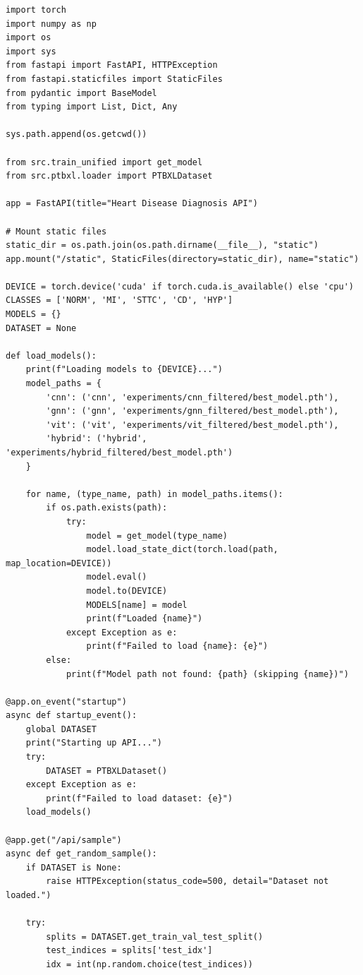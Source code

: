 \documentclass[12pt,a4paper]{report}
\begin{document}
\begin{lstlisting}[caption={Asynchronous FastAPI web service endpoint implementations (src/webapp/main.py)}]
import torch
import numpy as np
import os
import sys
from fastapi import FastAPI, HTTPException
from fastapi.staticfiles import StaticFiles
from pydantic import BaseModel
from typing import List, Dict, Any

sys.path.append(os.getcwd())

from src.train_unified import get_model
from src.ptbxl.loader import PTBXLDataset

app = FastAPI(title="Heart Disease Diagnosis API")

# Mount static files
static_dir = os.path.join(os.path.dirname(__file__), "static")
app.mount("/static", StaticFiles(directory=static_dir), name="static")

DEVICE = torch.device('cuda' if torch.cuda.is_available() else 'cpu')
CLASSES = ['NORM', 'MI', 'STTC', 'CD', 'HYP']
MODELS = {}
DATASET = None

def load_models():
    print(f"Loading models to {DEVICE}...")
    model_paths = {
        'cnn': ('cnn', 'experiments/cnn_filtered/best_model.pth'),
        'gnn': ('gnn', 'experiments/gnn_filtered/best_model.pth'),
        'vit': ('vit', 'experiments/vit_filtered/best_model.pth'),
        'hybrid': ('hybrid', 'experiments/hybrid_filtered/best_model.pth')
    }
    
    for name, (type_name, path) in model_paths.items():
        if os.path.exists(path):
            try:
                model = get_model(type_name)
                model.load_state_dict(torch.load(path, map_location=DEVICE))
                model.eval()
                model.to(DEVICE)
                MODELS[name] = model
                print(f"Loaded {name}")
            except Exception as e:
                print(f"Failed to load {name}: {e}")
        else:
            print(f"Model path not found: {path} (skipping {name})")

@app.on_event("startup")
async def startup_event():
    global DATASET
    print("Starting up API...")
    try:
        DATASET = PTBXLDataset()
    except Exception as e:
        print(f"Failed to load dataset: {e}")
    load_models()

@app.get("/api/sample")
async def get_random_sample():
    if DATASET is None:
        raise HTTPException(status_code=500, detail="Dataset not loaded.")
        
    try:
        splits = DATASET.get_train_val_test_split()
        test_indices = splits['test_idx']
        idx = int(np.random.choice(test_indices))
        

\end{lstlisting}
\end{document}
